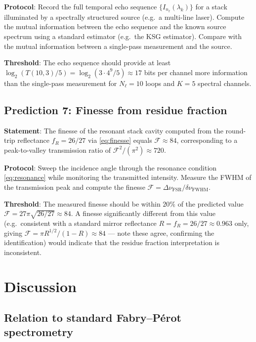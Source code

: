 \documentclass[11pt,twocolumn,a4paper]{article}
\theoremstyle{plain}
\theoremstyle{definition}
\theoremstyle{remark}
\begin{document}
\textbf{Protocol}: Record the full temporal echo sequence $\{I_{n_\ell}(\lambda_k)\}$ for a stack illuminated by a spectrally structured source (e.g.\ a multi-line laser). Compute the mutual information between the echo sequence and the known source spectrum using a standard estimator (e.g.\ the KSG estimator). Compare with the mutual information between a single-pass measurement and the source.

\textbf{Threshold}: The echo sequence should provide at least $\log_2(T(10,3)/5)=\log_2(3\cdot 4^9/5)\approx 17$ bits per channel more information than the single-pass measurement for $N_\ell=10$ loops and $K=5$ spectral channels.

\subsection{Prediction 7: Finesse from residue fraction}

\textbf{Statement}: The finesse of the resonant stack cavity computed from the round-trip reflectance $f_R=26/27$ via \eqref{eq:finesse} equals $\mathcal{F}\approx 84$, corresponding to a peak-to-valley transmission ratio of $\mathcal{F}^2/(\pi^2)\approx 720$.

\textbf{Protocol}: Sweep the incidence angle through the resonance condition \eqref{eq:resonance} while monitoring the transmitted intensity. Measure the FWHM of the transmission peak and compute the finesse $\mathcal{F}=\Delta\nu_\text{FSR}/\delta\nu_\text{FWHM}$.

\textbf{Threshold}: The measured finesse should be within $20\%$ of the predicted value $\mathcal{F}=27\pi\sqrt{26/27}\approx 84$. A finesse significantly different from this value (e.g.\ consistent with a standard mirror reflectance $R=f_R=26/27\approx 0.963$ only, giving $\mathcal{F}=\pi R^{1/2}/(1-R)\approx 84$ — note these agree, confirming the identification) would indicate that the residue fraction interpretation is inconsistent.

\section{Discussion}

\subsection{Relation to standard Fabry--P\'{e}rot spectrometry}
\end{document}
